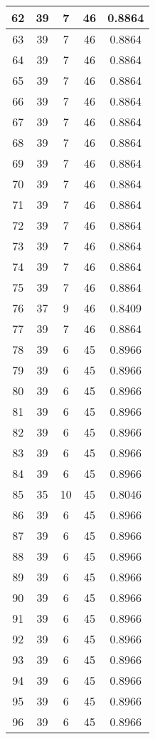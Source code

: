 \documentclass[letterpaper, 12pt]{article}
\begin{document}
\begin{longtable}{|c|c|c|c|c|}
\hline
62 & 39 & 7 & 46 & 0.8864 \\
\hline
63 & 39 & 7 & 46 & 0.8864 \\
\hline
64 & 39 & 7 & 46 & 0.8864 \\
\hline
65 & 39 & 7 & 46 & 0.8864 \\
\hline
66 & 39 & 7 & 46 & 0.8864 \\
\hline
67 & 39 & 7 & 46 & 0.8864 \\
\hline
68 & 39 & 7 & 46 & 0.8864 \\
\hline
69 & 39 & 7 & 46 & 0.8864 \\
\hline
70 & 39 & 7 & 46 & 0.8864 \\
\hline
71 & 39 & 7 & 46 & 0.8864 \\
\hline
72 & 39 & 7 & 46 & 0.8864 \\
\hline
73 & 39 & 7 & 46 & 0.8864 \\
\hline
74 & 39 & 7 & 46 & 0.8864 \\
\hline
75 & 39 & 7 & 46 & 0.8864 \\
\hline
76 & 37 & 9 & 46 & 0.8409 \\
\hline
77 & 39 & 7 & 46 & 0.8864 \\
\hline
78 & 39 & 6 & 45 & 0.8966 \\
\hline
79 & 39 & 6 & 45 & 0.8966 \\
\hline
80 & 39 & 6 & 45 & 0.8966 \\
\hline
81 & 39 & 6 & 45 & 0.8966 \\
\hline
82 & 39 & 6 & 45 & 0.8966 \\
\hline
83 & 39 & 6 & 45 & 0.8966 \\
\hline
84 & 39 & 6 & 45 & 0.8966 \\
\hline
85 & 35 & 10 & 45 & 0.8046 \\
\hline
86 & 39 & 6 & 45 & 0.8966 \\
\hline
87 & 39 & 6 & 45 & 0.8966 \\
\hline
88 & 39 & 6 & 45 & 0.8966 \\
\hline
89 & 39 & 6 & 45 & 0.8966 \\
\hline
90 & 39 & 6 & 45 & 0.8966 \\
\hline
91 & 39 & 6 & 45 & 0.8966 \\
\hline
92 & 39 & 6 & 45 & 0.8966 \\
\hline
93 & 39 & 6 & 45 & 0.8966 \\
\hline
94 & 39 & 6 & 45 & 0.8966 \\
\hline
95 & 39 & 6 & 45 & 0.8966 \\
\hline
96 & 39 & 6 & 45 & 0.8966 \\

\end{longtable}
\end{document}
